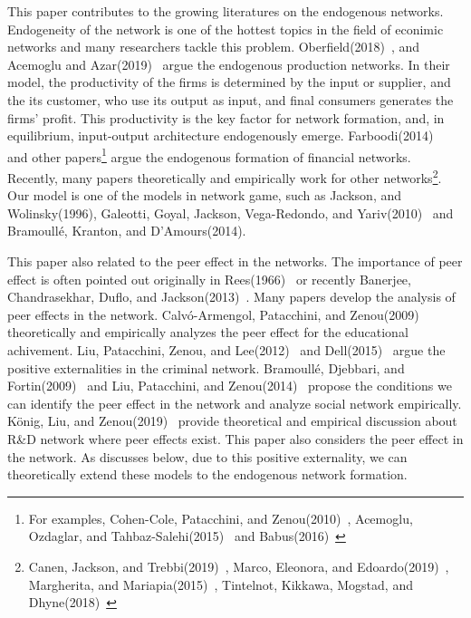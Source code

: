 \documentclass[12pt]{article}
\theoremstyle{definition}
\begin{document}
This paper contributes to the growing literatures on the endogenous networks.
Endogeneity of the network is one of the hottest topics in the field of econimic networks and many researchers tackle this problem.
Oberfield(2018)~\cite{ober}, and Acemoglu and Azar(2019)~\cite{endo_net} argue the endogenous production networks.
In their model, the productivity of the firms is determined by the input or supplier, and the its customer, who use its output as input, and final consumers generates the firms' profit.
This productivity is the key factor for network formation, and, in equilibrium, input-output architecture endogenously emerge.
Farboodi(2014)~\cite{farboodi} and other papers\footnote{For examples, Cohen-Cole, Patacchini, and Zenou(2010)~\cite{cohen}, Acemoglu, Ozdaglar, and Tahbaz-Salehi(2015)~\cite{acemo2015} and Babus(2016)~\cite{babus}} argue the endogenous formation of financial networks.
Recently, many papers theoretically and empirically work for other networks\footnote{Canen, Jackson, and Trebbi(2019)~\cite{canen}, Marco, Eleonora, and Edoardo(2019)~\cite{Marco2019}, Margherita, and Mariapia(2015)~\cite{marg}, Tintelnot, Kikkawa, Mogstad, and Dhyne(2018)~\cite{Tin}}.
Our model is one of the models in network game, such as Jackson, and Wolinsky(1996), Galeotti, Goyal, Jackson, Vega-Redondo, and Yariv(2010)~\cite{galeo} and Bramoull\'{e}, Kranton, and D'Amours(2014).

This paper also related to the peer effect in the networks.
The importance of peer effect is often pointed out originally in Rees(1966)~\cite{Rees} or recently Banerjee, Chandrasekhar, Duflo, and Jackson(2013)~\cite{ban}.
Many papers develop the analysis of peer effects in the network.
Calv\'{o}-Armengol, Patacchini, and Zenou(2009)~\cite{edu} theoretically and empirically analyzes the peer effect for the educational achivement.
Liu, Patacchini, Zenou, and Lee(2012)~\cite{criminal} and Dell(2015)~\cite{Dell} argue the positive externalities in the criminal network.
Bramoull\'{e}, Djebbari, and Fortin(2009)~\cite{identificationpeer} and Liu, Patacchini, and Zenou(2014)~\cite{endopeer} propose the conditions we can identify the peer effect in the network and analyze social network empirically.
K\"{o}nig, Liu, and Zenou(2019)~\cite {RandD} provide theoretical and empirical discussion about R\&D network where peer effects exist.
This paper also considers the peer effect in the network.
As discusses below, due to this positive externality, we can theoretically extend these models to the endogenous network formation.
\end{document}
